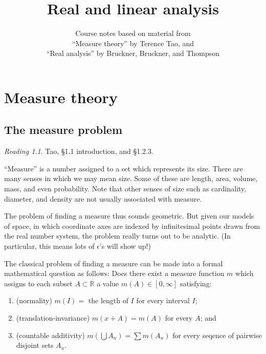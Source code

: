 \documentclass[11pt,oneside]{amsbook}
\title{Real and linear analysis}
\author{Course notes based on material from\\``Measure theory'' by Terence Tao, and\\``Real analysis'' by Bruckner, Bruckner, and Thompson}
\newcommand{\RR}{\mathbb R}
\theoremstyle{definition}
\theoremstyle{plain}
\theoremstyle{definition}
\theoremstyle{remark}
\newtheorem*{reading}{Reading}
\numberwithin{equation}{section}
\numberwithin{figure}{section}
\begin{document}
\maketitle

\tableofcontents

\chapter{Measure theory}

\section{The measure problem}

\begin{reading}
  Tao, \S1.1 introduction, and \S1.2.3.
\end{reading}

``Measure'' is a number assigned to a set which represents its size. There are many senses in which we may mean size. Some of these are length, area, volume, mass, and even probability. Note that other senses of size such as cardinality, diameter, and density are not usually associated with measure.

The problem of finding a measure thus sounds geometric. But given our models of space, in which coordinate axes are indexed by infinitesimal points drawn from the real number system, the problem really turns out to be analytic. (In particular, this means lots of $\epsilon$'s will show up!)

The classical problem of finding a measure can be made into a formal mathematical question as follows: Does there exist a measure function $m$ which assigns to each subset $A\subset\RR$ a value $m(A)\in[0,\infty]$ satisfying:
\begin{enumerate}
\item (normality) $m(I)=$ the length of $I$ for every interval $I$;
\item (translation-invariance) $m(x+A)=m(A)$ for every $A$; and
\item (countable additivity) $m(\bigcup A_n)=\sum m(A_n)$ for every seqence of pairwise disjoint sets $A_n$.
\end{enumerate}
\end{document}
